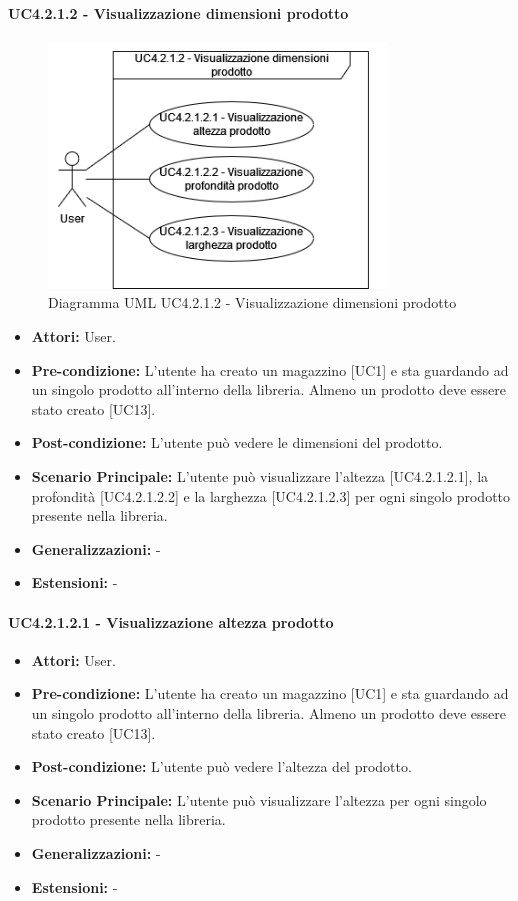 \paragraph{UC4.2.1.2 - Visualizzazione dimensioni prodotto}
\begin{figure}[H]
  \centering
  \includegraphics[width=0.8\textwidth]{UC_diagrams_1-10/UC4.2.1.2.drawio.png}
   \caption{Diagramma UML UC4.2.1.2 - Visualizzazione dimensioni prodotto}
\end{figure}
\begin{itemize} 
    \item \textbf{Attori:} User.
    \item \textbf{Pre-condizione:} L'utente ha creato un magazzino [UC1] e sta guardando ad un singolo prodotto all'interno della libreria. Almeno un prodotto deve essere stato creato [UC13].
    \item \textbf{Post-condizione:}  L'utente può vedere le dimensioni del prodotto.
    \item \textbf{Scenario Principale:} L'utente può visualizzare l'altezza [UC4.2.1.2.1], la profondità [UC4.2.1.2.2] e la larghezza [UC4.2.1.2.3] per ogni singolo prodotto presente nella libreria. 
    \item \textbf{Generalizzazioni:} -
    \item \textbf{Estensioni:} -
\end{itemize}


\paragraph{UC4.2.1.2.1 - Visualizzazione altezza prodotto}
\begin{itemize} 
    \item \textbf{Attori:} User.
    \item \textbf{Pre-condizione:} L'utente ha creato un magazzino [UC1] e sta guardando ad un singolo prodotto all'interno della libreria. Almeno un prodotto deve essere stato creato [UC13].
    \item \textbf{Post-condizione:}  L'utente può vedere l'altezza del prodotto.
    \item \textbf{Scenario Principale:} L'utente può visualizzare l'altezza per ogni singolo prodotto presente nella libreria. 
    \item \textbf{Generalizzazioni:} -
    \item \textbf{Estensioni:} -
\end{itemize}


